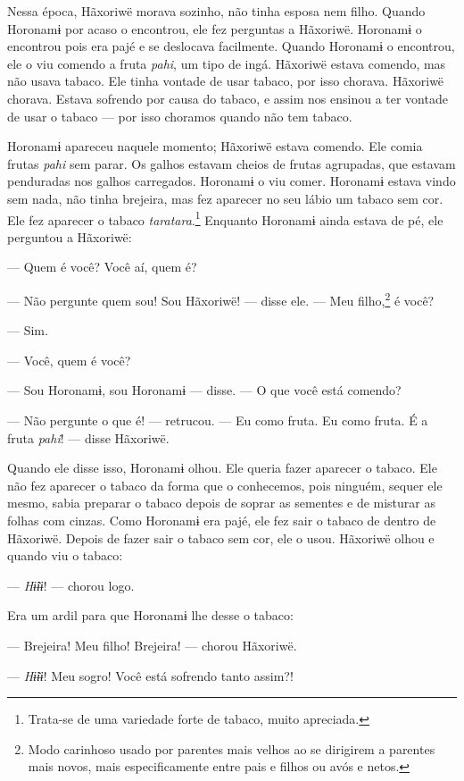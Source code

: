 Nessa época, Hãxoriwë morava sozinho, não tinha esposa nem
filho. Quando Horonamɨ por acaso o encontrou, ele fez
perguntas a Hãxoriwë. Horonamɨ o encontrou pois era pajé e se deslocava
facilmente. Quando Horonamɨ o encontrou, ele o viu comendo a
fruta \textit{pahi}, um tipo de ingá. Hãxoriwë estava comendo, mas não
usava tabaco. Ele tinha vontade de usar tabaco, por isso chorava.
Hãxoriwë chorava. Estava sofrendo por causa do tabaco, e assim nos
ensinou a ter vontade de usar o tabaco --- por isso choramos quando não
tem tabaco. 

Horonamɨ apareceu naquele momento; Hãxoriwë estava comendo. Ele comia
frutas \textit{pahi} sem parar. Os galhos estavam cheios de frutas
agrupadas, que estavam penduradas nos galhos carregados. Horonamɨ o viu
comer. Horonamɨ estava vindo sem nada, não tinha brejeira, mas fez
aparecer no seu lábio um tabaco sem cor. Ele fez aparecer o
tabaco \textit{taratara}.\footnote{Trata-se de uma variedade forte de tabaco, muito apreciada.}  Enquanto Horonamɨ ainda estava
de pé, ele perguntou a Hãxoriwë: 

--- Quem é você? Você aí, quem é? 

--- Não pergunte quem sou! Sou Hãxoriwë! --- disse ele. --- Meu
filho,\footnote{Modo carinhoso usado por parentes mais velhos ao se dirigirem a
parentes mais novos, mais especificamente entre pais e filhos ou avós e
netos.} é você? 

--- Sim.

--- Você, quem é você?

--- Sou Horonamɨ, sou Horonamɨ --- disse. --- O que você está comendo? 

--- Não pergunte o que é! --- retrucou. --- Eu como fruta. Eu como
fruta. É a fruta \textit{pahi}! --- disse Hãxoriwë. 

Quando ele disse isso, Horonamɨ olhou. Ele queria fazer aparecer o
tabaco. Ele não fez aparecer o tabaco da forma que o conhecemos, pois
ninguém, sequer ele mesmo, sabia preparar o tabaco depois de soprar as
sementes e de misturar as folhas com cinzas. Como Horonamɨ era pajé, ele
fez sair o tabaco de dentro de Hãxoriwë. Depois de fazer sair o tabaco
sem cor, ele o usou. Hãxoriwë olhou e quando viu o tabaco: 

--- \textit{Hɨ̃ɨɨ}! --- chorou logo. 

Era um ardil para que Horonamɨ lhe desse o tabaco: 

--- Brejeira! Meu filho! Brejeira! --- chorou Hãxoriwë. 

--- \textit{Hɨ̃ɨɨ}! Meu sogro! Você está sofrendo tanto assim?! 

